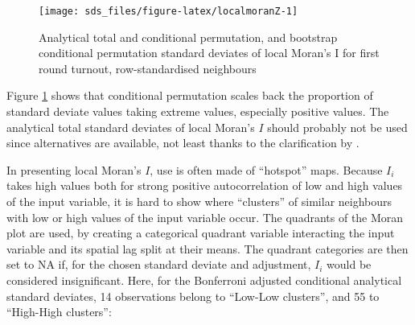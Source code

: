 \documentclass[]{book}
\newenvironment{Shaded}{\begin{snugshade}}{\end{snugshade}}
\newcommand{\CharTok}[1]{\textcolor[rgb]{0.31,0.60,0.02}{#1}}
\newcommand{\DataTypeTok}[1]{\textcolor[rgb]{0.13,0.29,0.53}{#1}}
\newcommand{\DecValTok}[1]{\textcolor[rgb]{0.00,0.00,0.81}{#1}}
\newcommand{\KeywordTok}[1]{\textcolor[rgb]{0.13,0.29,0.53}{\textbf{#1}}}
\newcommand{\NormalTok}[1]{#1}
\newcommand{\OperatorTok}[1]{\textcolor[rgb]{0.81,0.36,0.00}{\textbf{#1}}}
\newcommand{\OtherTok}[1]{\textcolor[rgb]{0.56,0.35,0.01}{#1}}
\newcommand{\StringTok}[1]{\textcolor[rgb]{0.31,0.60,0.02}{#1}}
\begin{document}
\begin{Shaded}
\end{Shaded}

\begin{figure}

{\centering \texttt{[image: sds\_files/figure-latex/localmoranZ-1]} 

}

\caption{Analytical total and conditional permutation, and bootstrap conditional permutation standard deviates of local Moran's I for first round turnout, row-standardised neighbours}\label{fig:localmoranZ}
\end{figure}

Figure \ref{fig:localmoranZ} shows that conditional permutation scales back the proportion of standard deviate values taking extreme values, especially positive values. The analytical total standard deviates of local Moran's \(I\) should probably not be used since alternatives are available, not least thanks to the clarification by \citet{sauer_oshan_rey_wolf_2021}.

In presenting local Moran's \(I\), use is often made of ``hotspot'' maps. Because \(I_i\) takes high values both for strong positive autocorrelation of low and high values of the input variable, it is hard to show where ``clusters'' of similar neighbours with low or high values of the input variable occur. The quadrants of the Moran plot are used, by creating a categorical quadrant variable interacting the input variable and its spatial lag split at their means. The quadrant categories are then set to NA if, for the chosen standard deviate and adjustment, \(I_i\) would be considered insignificant. Here, for the Bonferroni adjusted conditional analytical standard deviates, 14 observations belong to ``Low-Low clusters'', and 55 to ``High-High clusters'':
\end{document}
